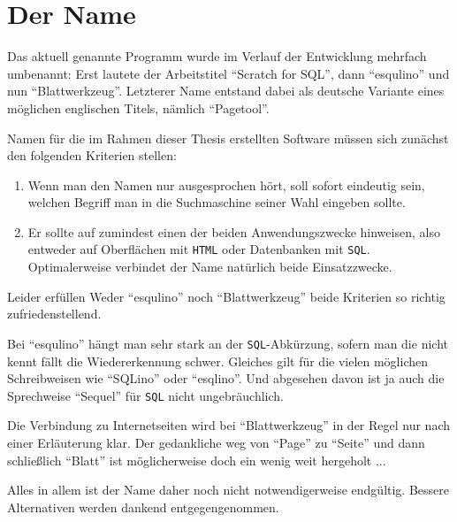 \section{Der Name \idename{}}
\label{anh:the-name}

Das aktuell \idename{} genannte Programm wurde im Verlauf der Entwicklung mehrfach umbenannt: Erst lautete der Arbeitstitel "`Scratch for SQL"', dann "`esqulino"' und nun "`Blattwerkzeug"'. Letzterer Name entstand dabei als deutsche Variante eines möglichen englischen Titels, nämlich "`Pagetool"'.

Namen für die im Rahmen dieser Thesis erstellten Software müssen sich zunächst den folgenden Kriterien stellen:

\begin{enumerate}
\item Wenn man den Namen nur ausgesprochen hört, soll sofort eindeutig sein, welchen Begriff man in die Suchmaschine seiner Wahl eingeben sollte.
\item Er sollte auf zumindest einen der beiden Anwendungszwecke hinweisen, also entweder auf Oberflächen mit \texttt{HTML} oder Datenbanken mit \texttt{SQL}. Optimalerweise verbindet der Name natürlich beide Einsatzzwecke.
\end{enumerate}

Leider erfüllen Weder "`esqulino"' noch "`Blattwerkzeug"' beide Kriterien so richtig zufriedenstellend.

Bei "`esqulino"' hängt man sehr stark an der \texttt{SQL}-Abkürzung, sofern man die nicht kennt fällt die Wiedererkennung schwer. Gleiches gilt für die vielen möglichen Schreibweisen wie "`SQLino"' oder "`esqlino"'. Und abgesehen davon ist ja auch die Sprechweise "`Sequel"' für \texttt{SQL} nicht ungebräuchlich.

Die Verbindung zu Internetseiten wird bei "`Blattwerkzeug"' in der Regel nur nach einer Erläuterung klar. Der gedankliche weg von "`Page"' zu "`Seite"' und dann schließlich "`Blatt"' ist möglicherweise doch ein wenig weit hergeholt ...

Alles in allem ist der Name daher noch nicht notwendigerweise endgültig. Bessere Alternativen werden dankend entgegengenommen.

